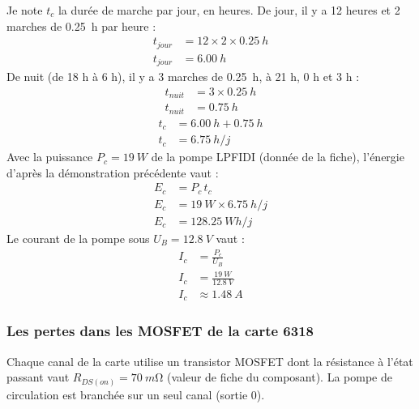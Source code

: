 \begin{demonstration}
Je note $t_c$ la durée de marche par jour, en heures. De jour, il y a 12 heures et 2 marches de \qty{0,25}{h} par heure :
\begin{align*}
t_{jour} &= 12 \times 2 \times \qty{0,25}{h}\\
t_{jour} &= \qty{6,00}{h}
\end{align*}
De nuit (de 18 h à 6 h), il y a 3 marches de \qty{0,25}{h}, à 21 h, 0 h et 3 h :
\begin{align*}
t_{nuit} &= 3 \times \qty{0,25}{h}\\
t_{nuit} &= \qty{0,75}{h}
\end{align*}
\begin{align*}
t_c &= \qty{6,00}{h} + \qty{0,75}{h}\\
t_c &= \qty{6,75}{h/j}
\end{align*}
Avec la puissance $P_c = \qty{19}{W}$ de la pompe LPFIDI (donnée de la fiche), l'énergie d'après la démonstration précédente vaut :
\begin{align*}
E_c &= P_c\, t_c\\
E_c &= \qty{19}{W} \times \qty{6,75}{h/j}\\
E_c &= \qty{128,25}{Wh/j}
\end{align*}
Le courant de la pompe sous $U_B = \qty{12,8}{V}$ vaut :
\begin{align*}
I_c &= \frac{P_c}{U_B}\\
I_c &= \frac{\qty{19}{W}}{\qty{12,8}{V}}\\
I_c &\approx \qty{1,48}{A}
\end{align*}
\end{demonstration}

\subsubsection*{Les pertes dans les MOSFET de la carte 6318}

Chaque canal de la carte utilise un transistor MOSFET dont la résistance à l'état passant vaut $R_{DS(on)} = \qty{70}{m\ohm}$ (valeur de fiche du composant). La pompe de circulation est branchée sur un seul canal (sortie 0).

